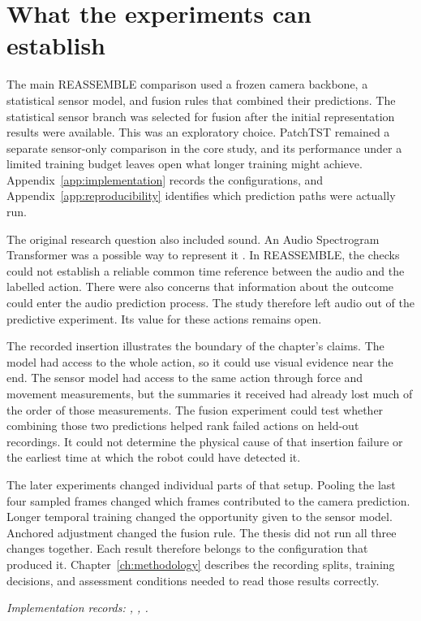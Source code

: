 \section{What the experiments can establish}

The main REASSEMBLE comparison used a frozen camera backbone, a statistical sensor model, and fusion rules that combined their predictions. The statistical sensor branch was selected for fusion after the initial representation results were available. This was an exploratory choice. PatchTST remained a separate sensor-only comparison in the core study, and its performance under a limited training budget leaves open what longer training might achieve. Appendix~\ref{app:implementation} records the configurations, and Appendix~\ref{app:reproducibility} identifies which prediction paths were actually run.

The original research question also included sound. An Audio Spectrogram Transformer was a possible way to represent it \parencite{P011}. In REASSEMBLE, the checks could not establish a reliable common time reference between the audio and the labelled action. There were also concerns that information about the outcome could enter the audio prediction process. The study therefore left audio out of the predictive experiment. Its value for these actions remains open.

The recorded insertion illustrates the boundary of the chapter’s claims. The model had access to the whole action, so it could use visual evidence near the end. The sensor model had access to the same action through force and movement measurements, but the summaries it received had already lost much of the order of those measurements. The fusion experiment could test whether combining those two predictions helped rank failed actions on held-out recordings. It could not determine the physical cause of that insertion failure or the earliest time at which the robot could have detected it.

The later experiments changed individual parts of that setup. Pooling the last four sampled frames changed which frames contributed to the camera prediction. Longer temporal training changed the opportunity given to the sensor model. Anchored adjustment changed the fusion rule. The thesis did not run all three changes together. Each result therefore belongs to the configuration that produced it. Chapter~\ref{ch:methodology} describes the recording splits, training decisions, and assessment conditions needed to read those results correctly.

\textit{Implementation records: , , .}
